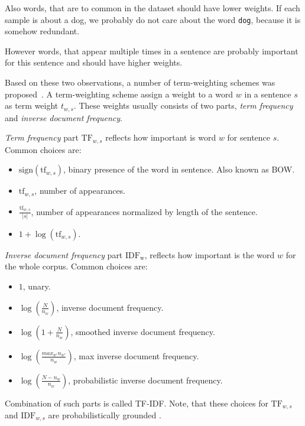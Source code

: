     Also words, that are to common in the dataset should have lower weights.
    If each sample is about a dog, we probably do not care about the word \texttt{dog}, because it is somehow redundant.
    
    However words, that appear multiple times in a sentence are probably important for this sentence and should have higher weights.
    
    Based on these two observations, a number of term-weighting schemes was proposed~\cite{salton1988term}.
    A term-weighting scheme assign a weight to a word $w$ in a sentence $s$ as term weight $t_{w,s}$.
    These weights usually consists of two parts, \emph{term frequency} and \emph{inverse document frequency}. 
    
    \emph{Term frequency} part $\mathrm{TF}_{w,s}$ reflects how important is word $w$ for sentence $s$.
    Common choices are:
    \begin{itemize}
        \item $\mathrm{sign}(\mathrm{tf}_{w,s})$, binary presence of the word in sentence. Also known as BOW.
        \item $\mathrm{tf}_{w,s}$, number of appearances.
        \item $\frac{\mathrm{tf}_{w,s}}{|s|}$, number of appearances normalized by length of the sentence.
        \item $1+\log(\mathrm{tf}_{w,s})$.
    \end{itemize}
    
    \emph{Inverse document frequency} part $\mathrm{IDF_w}$, reflects how important is the word $w$ for the whole corpus.
    Common choices are:
    \begin{itemize}
        \item $1$, unary.
        \item $\log \left(\frac{N}{n_w} \right)$, inverse document frequency.
        \item $\log \left( 1+\frac{N}{n_w} \right)$, smoothed inverse document frequency.
        \item $\log \left( \frac{max_{w'} n_{w'}}{n_w} \right)$, max inverse document frequency.
        \item $\log \left(\frac{N-n_w}{n_w} \right)$, probabilistic inverse document frequency.
    \end{itemize}

    Combination of such parts is called TF-IDF.
    Note, that these choices for $\mathrm{TF}_{w,s}$ and $\mathrm{IDF}_{w,s}$ are probabilistically grounded \cite{aizawa2003information}. %
    
